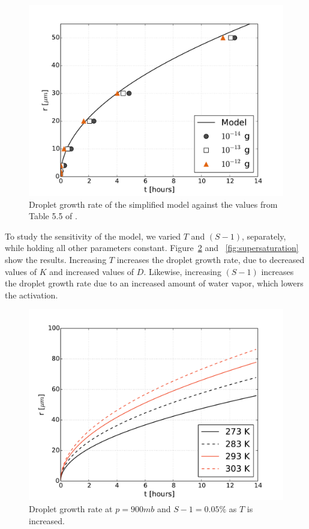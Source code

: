 \documentclass[]{article}
\begin{document}
\begin{figure}[h]
    \centering
    \includegraphics[width=\textwidth]{r_t.pdf}
    \caption{Droplet growth rate of the simplified model against the values from Table 5.5 of \cite{Curry}.}
    \label{fig:r_t}
\end{figure}


To study the sensitivity of the model, we varied $T$ and $(S - 1)$, separately,
while holding all other parameters constant. Figure~\ref{fig:temperature} and
~\ref{fig:supersaturation} show the results.  Increasing $T$ increases the
droplet growth rate, due to decreased values of $K$ and increased values of
$D$.  Likewise, increasing $(S - 1)$ increases the droplet growth rate due to
an increased amount of water vapor, which lowers the activation.

\begin{figure}
    \centering
    \includegraphics[width=\textwidth]{r_t_temperature.pdf}
    \caption{Droplet growth rate at $p=900 mb$ and $S - 1 = 0.05\%$ as $T$ is increased.}
    \label{fig:temperature}
\end{figure}
\end{document}
